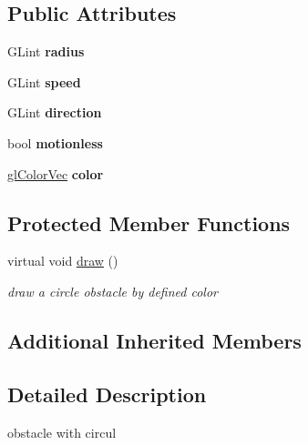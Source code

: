 \subsection*{Public Attributes}
\begin{DoxyCompactItemize}
\item 
\hypertarget{classCircularObstacle_adb4bc2ee2ab0a7ee03571663976bd2e1}{G\-Lint {\bfseries radius}}\label{classCircularObstacle_adb4bc2ee2ab0a7ee03571663976bd2e1}

\item 
\hypertarget{classCircularObstacle_adaa9bb8650d122ec2891a81d22fcb8fa}{G\-Lint {\bfseries speed}}\label{classCircularObstacle_adaa9bb8650d122ec2891a81d22fcb8fa}

\item 
\hypertarget{classCircularObstacle_a6bd3428e3a01544f7e29fe4ec2df95ca}{G\-Lint {\bfseries direction}}\label{classCircularObstacle_a6bd3428e3a01544f7e29fe4ec2df95ca}

\item 
\hypertarget{classCircularObstacle_aee1b031760bcaafed15496debe10197b}{bool {\bfseries motionless}}\label{classCircularObstacle_aee1b031760bcaafed15496debe10197b}

\item 
\hypertarget{classCircularObstacle_afeafb626ba908916fec5272442c0dbf1}{\hyperlink{Common_8h_a5113b6588451c418d38d8b3681eb6040}{gl\-Color\-Vec} {\bfseries color}}\label{classCircularObstacle_afeafb626ba908916fec5272442c0dbf1}

\end{DoxyCompactItemize}
\subsection*{Protected Member Functions}
\begin{DoxyCompactItemize}
\item 
virtual void \hyperlink{classCircularObstacle_a9e129c320c72141afebbfa5bc299a15e}{draw} ()
\begin{DoxyCompactList}\small\item\em draw a circle obstacle by defined color \end{DoxyCompactList}\end{DoxyCompactItemize}
\subsection*{Additional Inherited Members}


\subsection{Detailed Description}
obstacle with circul 

